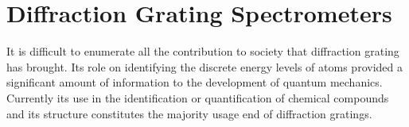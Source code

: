 \documentclass[12pt,twoside,english]{book}
\renewcommand{\~}{\perispomeni}%
\numberwithin{equation}{section}
\numberwithin{figure}{section}
\newcommand\fnurl[2]{%
 \href{#2}{#1}\footnote{\url{#2}}%
}
\begin{document}
%
%
%
%
%
%
%
\chapter{Diffraction Grating Spectrometers}
It is difficult to enumerate all the contribution to society that diffraction grating has brought. Its role on identifying the discrete energy levels of atoms provided a significant amount of information to the development of quantum mechanics. Currently its use in the identification or quantification of chemical compounds and its structure constitutes the majority usage end of diffraction gratings.




%
%
\end{document}
